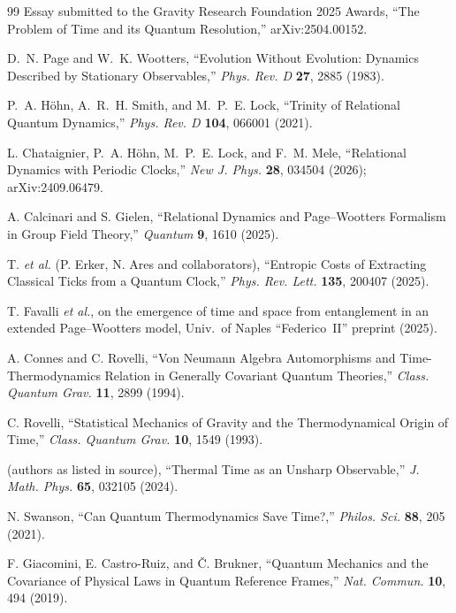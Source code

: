 \documentclass[11pt]{article}
\begin{document}
\begin{thebibliography}{99}
 Essay submitted to the Gravity Research Foundation 2025 Awards, ``The Problem of Time and its Quantum Resolution,'' arXiv:2504.00152.

 D.~N. Page and W.~K. Wootters, ``Evolution Without Evolution: Dynamics Described by Stationary Observables,'' \textit{Phys. Rev. D} \textbf{27}, 2885 (1983).

 P.~A. H\"ohn, A.~R.~H. Smith, and M.~P.~E. Lock, ``Trinity of Relational Quantum Dynamics,'' \textit{Phys. Rev. D} \textbf{104}, 066001 (2021).

 L. Chataignier, P.~A. H\"ohn, M.~P.~E. Lock, and F.~M. Mele, ``Relational Dynamics with Periodic Clocks,'' \textit{New J. Phys.} \textbf{28}, 034504 (2026); arXiv:2409.06479.

 A. Calcinari and S. Gielen, ``Relational Dynamics and Page--Wootters Formalism in Group Field Theory,'' \textit{Quantum} \textbf{9}, 1610 (2025).

 T. \textit{et al.} (P. Erker, N. Ares and collaborators), ``Entropic Costs of Extracting Classical Ticks from a Quantum Clock,'' \textit{Phys. Rev. Lett.} \textbf{135}, 200407 (2025).

 T. Favalli \textit{et al.}, on the emergence of time and space from entanglement in an extended Page--Wootters model, Univ.~of Naples ``Federico~II'' preprint (2025).

 A. Connes and C. Rovelli, ``Von Neumann Algebra Automorphisms and Time-Thermodynamics Relation in Generally Covariant Quantum Theories,'' \textit{Class. Quantum Grav.} \textbf{11}, 2899 (1994).

 C. Rovelli, ``Statistical Mechanics of Gravity and the Thermodynamical Origin of Time,'' \textit{Class. Quantum Grav.} \textbf{10}, 1549 (1993).

 (authors as listed in source), ``Thermal Time as an Unsharp Observable,'' \textit{J. Math. Phys.} \textbf{65}, 032105 (2024).

 N. Swanson, ``Can Quantum Thermodynamics Save Time?,'' \textit{Philos. Sci.} \textbf{88}, 205 (2021).

 F. Giacomini, E. Castro-Ruiz, and \v{C}. Brukner, ``Quantum Mechanics and the Covariance of Physical Laws in Quantum Reference Frames,'' \textit{Nat. Commun.} \textbf{10}, 494 (2019).


\end{thebibliography}
\end{document}
